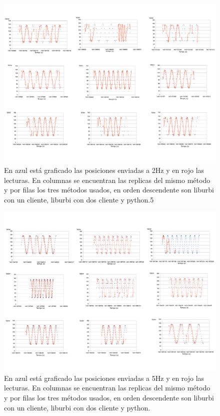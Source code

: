 \documentclass[12pt,a4paper,final,twoside]{book}
\begin{document}
\begin{figure}[H]
	\centering
    \includegraphics[scale=0.37]{images/sin2H.pdf}
	 \caption{En azul está graficado las posiciones enviadas a 2Hz y en rojo las lecturas. En columnas se encuentran las replicas del mismo método y por filas los tres métodos usados, en orden descendente son liburbi con un cliente, liburbi con dos cliente y python.5}
  \label{fig:sin2H}
\end{figure}
\begin{figure}[H]
	\centering
    \includegraphics[scale=0.37]{images/sin5H.pdf}
	 \caption{En azul está graficado las posiciones enviadas a 5Hz y en rojo las lecturas. En columnas se encuentran las replicas del mismo método y por filas los tres métodos usados, en orden descendente son liburbi con un cliente, liburbi con dos cliente y python.}
  \label{fig:sin5H}
\end{figure}
\end{document}
